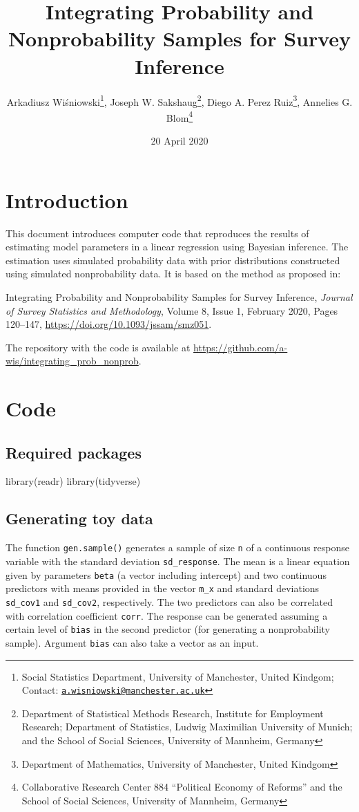\documentclass[
]{article}
\title{Integrating Probability and Nonprobability Samples for Survey
Inference}
\author{Arkadiusz Wiśniowski\footnote{Social Statistics Department,
  University of Manchester, United Kindgom; Contact:
  \href{mailto:a.wisniowski@manchester.ac.uk}{\nolinkurl{a.wisniowski@manchester.ac.uk}}},
Joseph W. Sakshaug\footnote{Department of Statistical Methods Research,
  Institute for Employment Research; Department of Statistics, Ludwig
  Maximilian University of Munich; and the School of Social Sciences,
  University of Mannheim, Germany}, Diego A. Perez Ruiz\footnote{Department
  of Mathematics, University of Manchester, United Kindgom}, Annelies G.
Blom\footnote{Collaborative Research Center 884 ``Political Economy of
  Reforms'' and the School of Social Sciences, University of Mannheim,
  Germany}}
\date{20 April 2020}
\newenvironment{Shaded}{\begin{snugshade}}{\end{snugshade}}
\newcommand{\FunctionTok}[1]{\textcolor[rgb]{0.00,0.00,0.00}{#1}}
\newcommand{\NormalTok}[1]{#1}
\begin{document}
\maketitle

\hypertarget{introduction}{%
\section{Introduction}\label{introduction}}

This document introduces computer code that reproduces the results of
estimating model parameters in a linear regression using Bayesian
inference. The estimation uses simulated probability data with prior
distributions constructed using simulated nonprobability data. It is
based on the method as proposed in:

Integrating Probability and Nonprobability Samples for Survey Inference,
\emph{Journal of Survey Statistics and Methodology}, Volume 8, Issue 1,
February 2020, Pages 120--147,
\url{https://doi.org/10.1093/jssam/smz051}.

The repository with the code is available at
\url{https://github.com/a-wis/integrating_prob_nonprob}.

\hypertarget{code}{%
\section{Code}\label{code}}

\hypertarget{required-packages}{%
\subsection{Required packages}\label{required-packages}}

\begin{Shaded}
\begin{Highlighting}[]
\FunctionTok{library}\NormalTok{(readr)}
\FunctionTok{library}\NormalTok{(tidyverse)}
\end{Highlighting}
\end{Shaded}

\hypertarget{generating-toy-data}{%
\subsection{Generating toy data}\label{generating-toy-data}}

The function \texttt{gen.sample()} generates a sample of size \texttt{n}
of a continuous response variable with the standard deviation
\texttt{sd\_response}. The mean is a linear equation given by parameters
\texttt{beta} (a vector including intercept) and two continuous
predictors with means provided in the vector \texttt{m\_x} and standard
deviations \texttt{sd\_cov1} and \texttt{sd\_cov2}, respectively. The
two predictors can also be correlated with correlation coefficient
\texttt{corr}. The response can be generated assuming a certain level of
\texttt{bias} in the second predictor (for generating a nonprobability
sample). Argument \texttt{bias} can also take a vector as an input.
\end{document}
